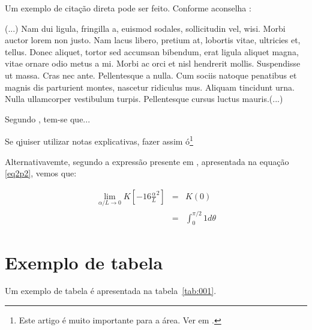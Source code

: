 \documentclass[
	12pt,				%
	openright,			%
	oneside,			%
	a4paper,			%
	english,			%
	brazil				%
	]{abntex2}
\begin{document}
Um exemplo de citação direta pode ser feito. Conforme aconselha \textcite{boyle1772-a}:



\begin{citacao}
	(...) Nam dui ligula, fringilla a, euismod sodales, sollicitudin vel, wisi. Morbi auctor lorem non justo. Nam lacus libero, pretium at, lobortis vitae, ultricies et, tellus. Donec aliquet, tortor sed accumsan bibendum, erat ligula aliquet magna, vitae ornare odio metus a mi. Morbi ac orci et nisl hendrerit mollis. Suspendisse ut massa. Cras nec ante. Pellentesque a nulla. Cum sociis natoque penatibus et magnis dis parturient montes, nascetur ridiculus mus. Aliquam tincidunt urna. Nulla ullamcorper vestibulum turpis. Pellentesque cursus luctus mauris.(...)
\end{citacao}

Segundo \cite{lima2025}, tem-se que...

Se qjuiser utilizar notas explicativas, fazer assim ó\footnote{Este artigo é muito importante para a área. Ver em \textcite[p.4]{lima2025}.}

Alternativavemte, segundo a expressão presente em \textcite[p.~3]{lima2025}, apresentada na equação \eqref{eq2p2}, vemos que:

\begin{eqnarray}
	\lim_{\alpha / L \to 0} K  \left[-16 {{\frac{\alpha}{L}}^{2}}\right]  &=& K(0) \label{eq2p1} \nonumber \\ %
	&=& \int_{0}^{\pi / 2} 1 d\theta \label{eq2p2}
\end{eqnarray}

\section{Exemplo de tabela}

Um exemplo de tabela é apresentada na tabela~\ref{tab:001}. 
\end{document}
